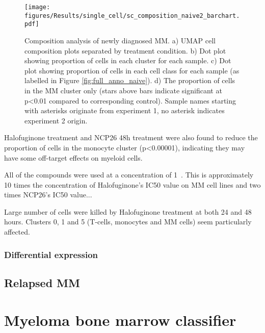 \begin{figure}[htb]
\centering
\texttt{[image: figures/Results/single\_cell/sc\_composition\_naive2\_barchart.pdf]}
\caption[scRNA-seq composition analysis- newly diagnosed MM]{Composition analysis of newly diagnosed MM.
    a) UMAP cell composition plots separated by treatment condition.
    b) Dot plot showing proportion of cells in each cluster for each sample.
    c) Dot plot showing proportion of cells in each cell class for each sample (as labelled in Figure \ref{fig:full_anno_naive}).
    d) The proportion of cells in the MM cluster only (stars above bars indicate significant at p<0.01 compared to corresponding control).
    Sample names starting with asterisks originate from experiment 1, no asterisk indicates experiment 2 origin.}
\label{fig:composition_naive}
\end{figure}

Halofuginone treatment and NCP26 48h treatment were also found to reduce the proportion of cells in the monocyte cluster (p<0.00001), indicating they may have some off-target effects on myeloid cells.

All of the compounds were used at a concentration of 1\si{\micro\Molar}.
This is approximately 10 times the concentration of Halofuginone's IC50 value on MM cell lines and two times NCP26's IC50 value...

Large number of cells were killed by Halofuginone treatment at both 24 and 48 hours.
Clusters 0, 1 and 5 (T-cells, monocytes and MM cells) seem particularly affected.

\subsubsection{Differential expression}




\subsection{Relapsed MM}


\section{Myeloma bone marrow classifier}